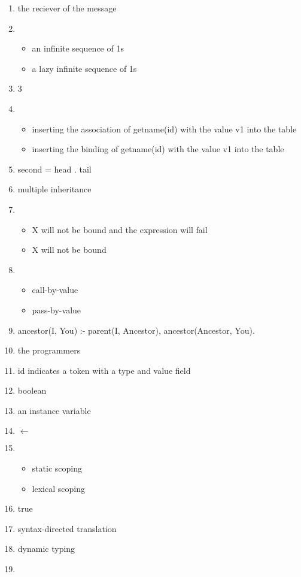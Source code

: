 \documentclass{exam}
\begin{document}
\begin{enumerate}
\item the reciever of the message
\item \begin{itemize}
\item an infinite sequence of 1s
\item a lazy infinite sequence of 1s
\end{itemize}
\item 3
\item \begin{itemize}
\item inserting the association of getname(id) with the value v1 into the table
\item inserting the binding of getname(id) with the value v1 into the table
\end{itemize}
\item second = head . tail
\item multiple inheritance
\item \begin{itemize}
\item X will not be bound and the expression will fail
\item X will not be bound
\end{itemize}
\item \begin{itemize}
\item call-by-value
\item pass-by-value
\end{itemize}
\item ancestor(I, You) :- parent(I, Ancestor), ancestor(Ancestor, You). 
\item the programmers
\item id indicates a token with a type and value field
\item boolean
\item an instance variable
\item $\leftarrow$
\item \begin{itemize}
\item static scoping
\item lexical scoping
\end{itemize}
\item true
\item syntax-directed translation
\item dynamic typing
\item \begin{itemize}

\end{itemize}
\end{enumerate}
\end{document}
